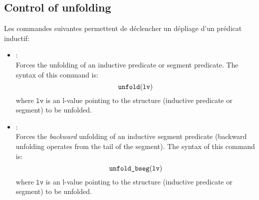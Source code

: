 \subsection{Control of unfolding}
Les commandes suivantes permettent de déclencher un dépliage d'un prédicat
inductif:
\begin{itemize}
\item[\dcommand{unfold}]: \\
  Forces the unfolding of an inductive predicate or segment predicate.
  The syntax of this command is:
  \[
  \texttt{unfold}( \texttt{lv} )
  \]
  where \( \texttt{lv} \) is an l-value pointing to the structure
  (inductive predicate or segment) to be unfolded.
\item[\dcommand{unfold\textunderscore bseg}]: \\
  Forces the {\em backward} unfolding of an inductive segment predicate
  (backward unfolding operates from the tail of the segment).
  The syntax of this command is:
  \[
  \texttt{unfold\_bseg}( \texttt{lv} )
  \]
  where \( \texttt{lv} \) is an l-value pointing to the structure
  (inductive predicate or segment) to be unfolded.
\end{itemize}

